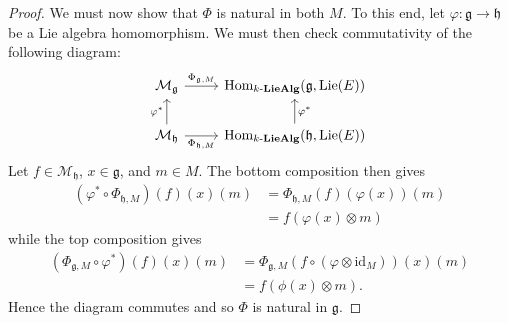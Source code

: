 \begin{proof}
  We must now show that $ \Phi $ is natural in both $ M $. To this end, let $ \varphi: \mathfrak{g} \to \mathfrak{h} $ be a Lie algebra homomorphism. We must then check commutativity of the following diagram:
  \[\begin{tikzcd}
	  {\mathcal{M}_\mathfrak{g}} & {\text{Hom}_{k\text{-}\mathbf{LieAlg}}(\mathfrak{g}, \text{Lie}(E))} \\
	  {\mathcal{M}_\mathfrak{h}} & {\text{Hom}_{k\text{-}\mathbf{LieAlg}}(\mathfrak{h}, \text{Lie}(E))}
	  \arrow["{\Phi_{\mathfrak{h},M}}"', from=2-1, to=2-2]
	  \arrow["{\Phi_{\mathfrak{g}, M}}", from=1-1, to=1-2]
	  \arrow["{\varphi^*}"', from=2-2, to=1-2]
	  \arrow["{\varphi^*}", from=2-1, to=1-1]
  \end{tikzcd}\]
  Let $ f \in \mathcal{M}_\mathfrak{h} $, $ x \in \mathfrak{g} $, and $ m \in M $. The bottom composition then gives
  \begin{align*}
    (\varphi^* \circ \Phi_{\mathfrak{h}, M})(f)(x)(m) &= \Phi_{\mathfrak{h}, M}(f)(\varphi(x))(m) \\
                                                      &= f(\varphi(x) \otimes m)
  \end{align*}
  while the top composition gives
  \begin{align*}
    (\Phi_{\mathfrak{g}, M} \circ \varphi^*)(f)(x)(m) &= \Phi_{\mathfrak{g}, M}(f \circ (\varphi \otimes \text{id}_M))(x)(m) \\
                                                      &= f(\phi(x) \otimes m)
  .\end{align*}
  Hence the diagram commutes and so $ \Phi $ is natural in $ \mathfrak{g} $.
\end{proof}

